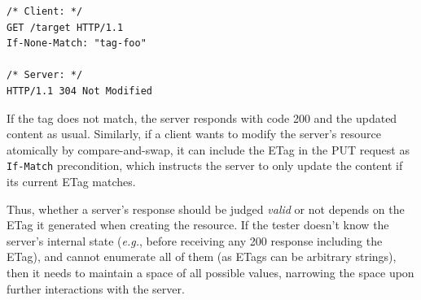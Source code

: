 \documentclass[12pt,oneside]{amsbook}
\newcommand{\inlinec}[1]{\lstinline[style=customc]{#1}}
\numberwithin{section}{chapter}
\numberwithin{figure}{chapter}
\numberwithin{equation}{chapter}
\begin{document}
\begin{lstlisting}[style=customc]
/* Client: */
GET /target HTTP/1.1
If-None-Match: "tag-foo"

/* Server: */
HTTP/1.1 304 Not Modified
\end{lstlisting}

If the tag does not match, the server responds with code 200 and the updated
content as usual.  Similarly, if a client wants to modify the server's resource
atomically by compare-and-swap, it can include the ETag in the PUT request as
\inlinec{If-Match} precondition, which instructs the server to only update the
content if its current ETag matches.

Thus, whether a server's response should be judged {\em valid} or not
depends on the ETag it generated
when creating the resource.  If the tester doesn't know the server's internal
state ({\it e.g.}, before receiving any 200 response including the ETag), and
cannot enumerate all of them (as ETags can be arbitrary strings), then it needs
to maintain a space of all possible values, narrowing the space upon further
interactions with the server.
\end{document}
